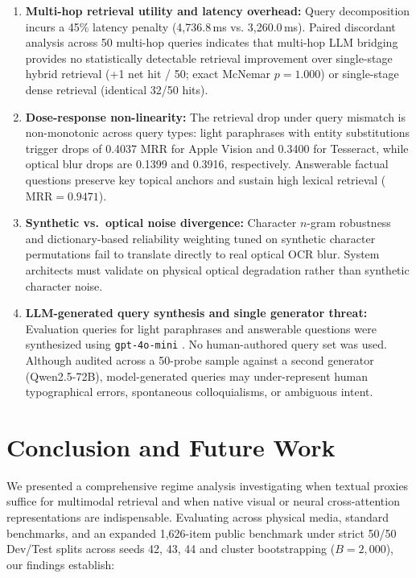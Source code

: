 \documentclass[conference]{IEEEtran}
\begin{document}
\begin{enumerate}
    \item \textbf{Multi-hop retrieval utility and latency overhead:} Query decomposition incurs a 45\% latency penalty (4,736.8\,ms vs. 3,260.0\,ms). Paired discordant analysis across 50 multi-hop queries indicates that multi-hop LLM bridging provides no statistically detectable retrieval improvement over single-stage hybrid retrieval (+1 net hit / 50; exact McNemar $p = 1.000$) or single-stage dense retrieval (identical 32/50 hits).
    \item \textbf{Dose-response non-linearity:} The retrieval drop under query mismatch is non-monotonic across query types: light paraphrases with entity substitutions trigger drops of 0.4037 MRR for Apple Vision and 0.3400 for Tesseract, while optical blur drops are 0.1399 and 0.3916, respectively. Answerable factual questions preserve key topical anchors and sustain high lexical retrieval ($\text{MRR} = 0.9471$).
    \item \textbf{Synthetic vs.\ optical noise divergence:} Character $n$-gram robustness and dictionary-based reliability weighting tuned on synthetic character permutations fail to translate directly to real optical OCR blur. System architects must validate on physical optical degradation rather than synthetic character noise.
    \item \textbf{LLM-generated query synthesis and single generator threat:} Evaluation queries for light paraphrases and answerable questions were synthesized using \texttt{gpt-4o-mini} \cite{openai2024gpt4o}. No human-authored query set was used. Although audited across a 50-probe sample against a second generator (Qwen2.5-72B), model-generated queries may under-represent human typographical errors, spontaneous colloquialisms, or ambiguous intent.
\end{enumerate}

\section{Conclusion and Future Work}
We presented a comprehensive regime analysis investigating when textual proxies suffice for multimodal retrieval and when native visual or neural cross-attention representations are indispensable. Evaluating across physical media, standard benchmarks, and an expanded 1,626-item public benchmark under strict 50/50 Dev/Test splits across seeds 42, 43, 44 and cluster bootstrapping ($B=2{,}000$), our findings establish:
\end{document}
